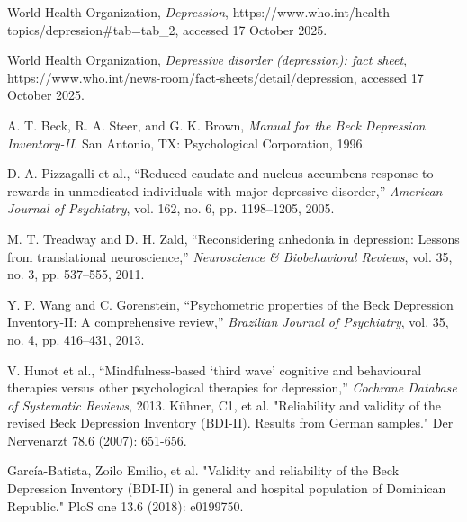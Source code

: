 \documentclass[conference]{IEEEtran}
\begin{document}
\begin{thebibliography}{00}

World Health Organization,
\emph{Depression},
https://www.who.int/health-topics/depression\#tab=tab\_2,
accessed 17 October 2025.


World Health Organization,
\emph{Depressive disorder (depression): fact sheet},
https://www.who.int/news-room/fact-sheets/detail/depression,
accessed 17 October 2025.




 A. T. Beck, R. A. Steer, and G. K. Brown, \textit{Manual for the Beck Depression Inventory-II}. San Antonio, TX: Psychological Corporation, 1996.

 D. A. Pizzagalli et al., ``Reduced caudate and nucleus accumbens response to rewards in unmedicated individuals with major depressive disorder,'' \textit{American Journal of Psychiatry}, vol. 162, no. 6, pp. 1198–1205, 2005.

 M. T. Treadway and D. H. Zald, ``Reconsidering anhedonia in depression: Lessons from translational neuroscience,'' \textit{Neuroscience \& Biobehavioral Reviews}, vol. 35, no. 3, pp. 537–555, 2011.

 Y. P. Wang and C. Gorenstein, ``Psychometric properties of the Beck Depression Inventory-II: A comprehensive review,'' \textit{Brazilian Journal of Psychiatry}, vol. 35, no. 4, pp. 416–431, 2013.

 V. Hunot et al., ``Mindfulness-based `third wave' cognitive and behavioural therapies versus other psychological therapies for depression,'' \textit{Cochrane Database of Systematic Reviews}, 2013.
 Kühner, C1, et al. "Reliability and validity of the revised Beck Depression Inventory (BDI-II). Results from German samples." Der Nervenarzt 78.6 (2007): 651-656.

 García-Batista, Zoilo Emilio, et al. "Validity and reliability of the Beck Depression Inventory (BDI-II) in general and hospital population of Dominican Republic." PloS one 13.6 (2018): e0199750.



\end{thebibliography}
\end{document}
